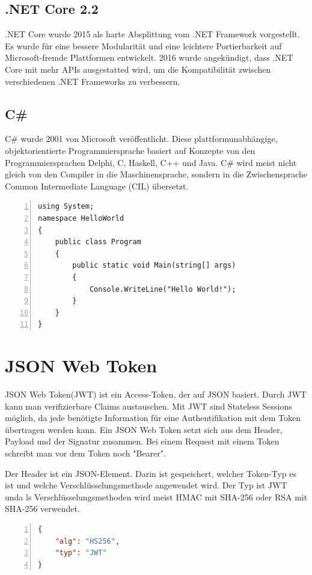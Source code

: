 \subsection{.NET Core 2.2}
.NET Core wurde 2015 als harte Absplittung vom .NET Framework vorgestellt. Es wurde für eine bessere Modularität und eine leichtere Portierbarkeit auf Microsoft-fremde Plattformen entwickelt. 2016 wurde angekündigt, dass .NET Core mit mehr APIs ausgestatted wird, um die Kompatibilität zwischen verschiedenen .NET Frameworks zu verbessern. \autocite{wikiDotnet}

\subsection{C\#}
C\# wurde 2001 von Microsoft veröffentlicht. Diese plattformunabhängige, objektorientierte Programmiersprache basiert auf Konzepte von den Programmiersprachen Delphi, C, Haskell, C++ und Java.
C\# wird meist nicht gleich von den Compiler in die Maschinensprache, sondern in die Zwischensprache Common Intermediate Language (CIL) übersetzt. \autocite{wikiCSharp}

\begin{lstlisting}[caption={C\#-Syntaxbeispiel},captionpos=b, numbers=left, backgroundcolor=\color{black!10}, language={[Sharp]C}]
using System;
namespace HelloWorld
{
	public class Program
	{
		public static void Main(string[] args)
		{
			Console.WriteLine("Hello World!");
		}
	}
}
\end{lstlisting}

\section{JSON Web Token}
JSON Web Token(JWT) ist ein Access-Token, der auf JSON basiert. Durch JWT kann man verifizierbare Claims austauschen. Mit JWT sind Stateless Sessions möglich, da jede benötigte Information für eine Authentifikation mit dem Token übertragen werden kann. Ein JSON Web Token setzt sich aus dem Header, Payload und der Signatur zusammen. Bei einem Request mit einem Token schreibt man vor dem Token noch "Bearer". \autocite{wikiJWT}

Der Header ist ein JSON-Element. Darin ist gespeichert, welcher Token-Typ es ist und welche Verschlüsselungsmethode angewendet wird. Der Typ ist JWT unda ls Verschlüsselungsmethoden wird meist HMAC mit SHA-256 oder RSA mit SHA-256 verwendet. \autocite{wikiJWT} \\
\begin{lstlisting}[caption={JWT-Header Beispiel},captionpos=b, numbers=left, backgroundcolor=\color{black!10}, language=json]
{
	"alg": "HS256",
	"typ": "JWT"
}
\end{lstlisting}

